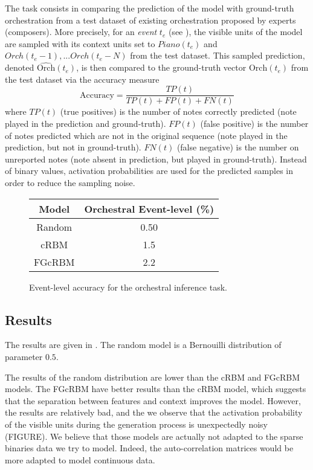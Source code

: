 \documentclass[letterpaper]{article}
\begin{document}
The task consists in comparing the prediction of the model with ground-truth orchestration from a test dataset of existing orchestration proposed by experts (composers). More precisely, for an \textit{event} $t_{e}$ (see ), the visible units of the model are sampled with its context units set to $Piano(t_{e})$ and $Orch(t_{e}-1),... Orch(t_{e}-N)$ from the test dataset. This sampled prediction, denoted $\hat{\text{Orch}}(t_{e})$, is then compared to the ground-truth vector $\text{Orch}(t_{e})$ from the test dataset via the accuracy measure
\begin{equation}
\text{Accuracy}  = \frac{TP(t)}{TP(t) + FP(t) + FN(t)}
\label{eq:accuracy}
\end{equation}
where $TP(t)$ (true positives) is the number of notes correctly predicted (note played in the prediction and ground-truth). $FP(t)$ (false positive) is the number of notes predicted which are not in the original sequence (note played in the prediction, but not in ground-truth). $FN(t)$ (false negative) is the number on unreported notes (note absent in prediction, but played in ground-truth). 
Instead of binary values, activation probabilities are used for the predicted samples in order to reduce the sampling noise.

\begin{figure}
\centering
\begin{tabular}{c c}
\hline
Model & Orchestral Event-level (\%)\\
\hline
Random & 0.50\\ 
\hline \hline
cRBM & 1.5\\ 
FGcRBM & 2.2\\ 
\end{tabular}
\caption{Event-level accuracy for the orchestral inference task.}
\label{fig:result_event_level}
\end{figure}

\subsection{Results}
The results are given in . The random model is a Bernouilli distribution of parameter $0.5$.

The results of the random distribution are lower than the cRBM and FGcRBM models. The FGcRBM have better results than the cRBM model, which suggests that the separation between features and context improves the model.
However, the results are relatively bad, and the we observe that the activation probability of the visible units during the generation process is unexpectedly noisy (FIGURE). We believe that those models are actually not adapted to the sparse binaries data we try to model. Indeed, the auto-correlation matrices would be more adapted to model continuous data.
\end{document}
